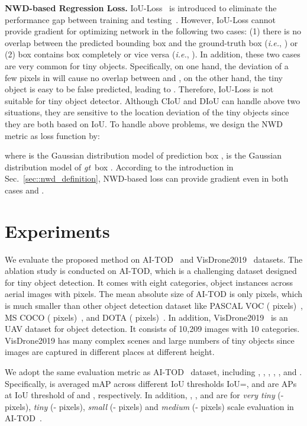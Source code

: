 \documentclass{article}
\newcommand{\ie}{\textit{i.e.}}
\newcommand{\gt}{\textit{gt}~}
\begin{document}
\textbf{NWD-based Regression Loss.} IoU-Loss~\cite{Unitbox_2016_ACMM} is introduced to eliminate the performance gap between training and testing~\cite{GIoU_loss_2019_CVPR}. However, IoU-Loss cannot provide gradient for optimizing network in the following two cases: (1) there is no overlap between the predicted bounding box  and the ground-truth box  (\ie, ) or (2) box  contains box  completely or vice versa (\ie, ). In addition, these two cases are very common for tiny objects. Specifically, on one hand, the deviation of a few pixels in  will cause no overlap between  and , on the other hand, the tiny object is easy to be false predicted, leading to . Therefore, IoU-Loss is not suitable for tiny object detector. Although CIoU and DIoU can handle above two situations, they are sensitive to the location deviation of the tiny objects since they are both based on IoU. To handle above problems, we design the NWD metric as loss function by:

where  is the Gaussian distribution model of prediction box ,  is the Gaussian distribution model of \gt box . According to the introduction in Sec.~\ref{sec::nwd_definition}, NWD-based loss can provide gradient even in both cases  and .

\section{Experiments}

\label{experiment_details}
We evaluate the proposed method on AI-TOD~\cite{AI-TOD_2020_ICPR} and VisDrone2019~\cite{visdrone2019_2019_iccvw} datasets. The ablation study is conducted on AI-TOD, which is a challenging dataset designed for tiny object detection. It comes with eight categories,  object instances across  aerial images with  pixels. The mean absolute size of AI-TOD is only  pixels, which is much smaller than other object detection dataset like PASCAL VOC ( pixels)~\cite{PASCAL-VOC_2015-IJCV}, MS COCO ( pixels)~\cite{COCO_2014_ECCV}, and DOTA ( pixels)~\cite{DOTA_2018_CVPR}. In addition, VisDrone2019~\cite{visdrone2019_2019_iccvw} is an UAV dataset for object detection. It consists of 10,209 images with 10 categories. VisDrone2019 has many complex scenes and large numbers of tiny objects since images are captured in different places at different height.

We adopt the same evaluation metric as AI-TOD~\cite{AI-TOD_2020_ICPR} dataset, including , , , , ,  and . Specifically,  is averaged mAP across different IoU thresholds IoU=,  and  are APs at IoU threshold of  and , respectively. In addition, , ,  and  are for \textit{very tiny} (- pixels), \textit{tiny} (- pixels), \textit{small} (- pixels) and \textit{medium} (- pixels) scale evaluation in AI-TOD~\cite{AI-TOD_2020_ICPR}.
\end{document}
